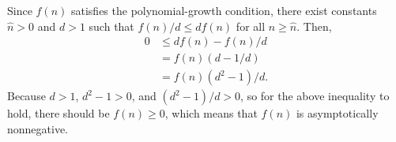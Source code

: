 Since $f(n)$ satisfies the polynomial-growth condition, there exist constants $\widehat{n}>0$ and $d>1$ such that $f(n)/d\le df(n)$ for all $n\ge\widehat{n}$.
Then,
\begin{align*}
    0 &\le df(n)-f(n)/d \\
    &= f(n)(d-1/d) \\
    &= f(n)(d^2-1)/d.
\end{align*}
Because $d>1$, $d^2-1>0$, and $(d^2-1)/d>0$, so for the above inequality to hold, there should be $f(n)\ge0$, which means that $f(n)$ is asymptotically nonnegative.
